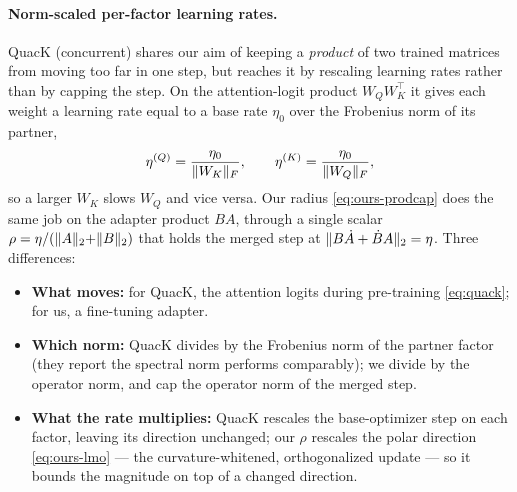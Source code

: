 \documentclass[11pt]{article}
\DeclarePairedDelimiter{\norm}{\lVert}{\rVert}
\theoremstyle{plain}
\theoremstyle{definition}
\theoremstyle{remark}
\begin{document}
\paragraph{Norm-scaled per-factor learning rates.} QuacK \cite{quack} (concurrent) shares our aim of keeping a \emph{product} of two trained matrices from moving too far in one step, but reaches it by rescaling learning rates rather than by capping the step. On the attention-logit product $W_QW_K^\top$ it gives each weight a learning rate equal to a base rate $\eta_0$ over the Frobenius norm of its partner,
\begin{equation}
  \eta^{(Q)}=\frac{\eta_0}{\norm{W_K}_F},\qquad
  \eta^{(K)}=\frac{\eta_0}{\norm{W_Q}_F},
  \label{eq:quack}
\end{equation}
so a larger $W_K$ slows $W_Q$ and vice versa. Our radius \eqref{eq:ours-prodcap} does the same job on the adapter product $BA$, through a single scalar $\rho=\eta/(\norm{A}_2{+}\norm{B}_2)$ that holds the merged step at $\norm{B\dot A+\dot B A}_2=\eta$. Three differences:
\begin{itemize}[leftmargin=1.5em,itemsep=1pt,topsep=2pt]
  \item \textbf{What moves:} for QuacK, the attention logits during pre-training \eqref{eq:quack}; for us, a fine-tuning adapter.
  \item \textbf{Which norm:} QuacK divides by the Frobenius norm of the partner factor (they report the spectral norm performs comparably); we divide by the operator norm, and cap the operator norm of the merged step.
  \item \textbf{What the rate multiplies:} QuacK rescales the base-optimizer step on each factor, leaving its direction unchanged; our $\rho$ rescales the polar direction \eqref{eq:ours-lmo} --- the curvature-whitened, orthogonalized update --- so it bounds the magnitude on top of a changed direction.
\end{itemize}

\end{document}

